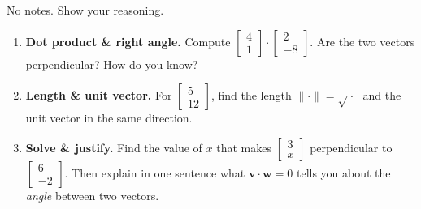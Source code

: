 \documentclass[10pt]{article}
\newcommand{\vv}{\mathbf{v}}
\newcommand{\ww}{\mathbf{w}}
\begin{document}
\namedateperiod

\vspace{0.15in}

No notes. Show your reasoning.

\begin{enumerate}[leftmargin=1.8em, itemsep=16pt]
  \item \textbf{Dot product \& right angle.} Compute
        $\begin{bmatrix} 4 \\ 1 \end{bmatrix}\cdot\begin{bmatrix} 2 \\ -8 \end{bmatrix}$.
        Are the two vectors perpendicular? How do you know?
        \vspace{1.1cm}
  \item \textbf{Length \& unit vector.} For $\begin{bmatrix} 5 \\ 12 \end{bmatrix}$, find the length
        $\|\cdot\|=\sqrt{\;\cdot\;}$ and the unit vector in the same direction.
        \vspace{1.3cm}
  \item \textbf{Solve \& justify.} Find the value of $x$ that makes
        $\begin{bmatrix} 3 \\ x \end{bmatrix}$ perpendicular to $\begin{bmatrix} 6 \\ -2 \end{bmatrix}$.
        Then explain in one sentence what $\vv\cdot\ww=0$ tells you about the \emph{angle} between two
        vectors.
\end{enumerate}
\end{document}
